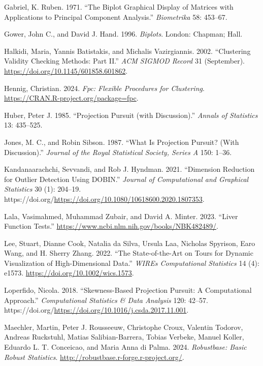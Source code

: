 \documentclass[
  12pt,
]{interact}
\newlength{\cslhangindent}
\newenvironment{CSLReferences}[2] %
 {\begin{list}{}{%
  \setlength{\itemindent}{0pt}
  \setlength{\leftmargin}{0pt}
  \setlength{\parsep}{0pt}
  \ifodd #1
   \setlength{\leftmargin}{\cslhangindent}
   \setlength{\itemindent}{-1\cslhangindent}
  \fi
  \setlength{\itemsep}{#2\baselineskip}}}
 {\end{list}}
\begin{document}
\begin{CSLReferences}{1}{0}
Gabriel, K. Ruben. 1971. {``The {B}iplot {G}raphical {D}isplay of
{M}atrices with {A}pplications to {P}rincipal {C}omponent {A}nalysis.''}
\emph{Biometrika} 58: 453--67.

Gower, John C., and David J. Hand. 1996. \emph{Biplots}. London:
Chapman; Hall.

Halkidi, Maria, Yannis Batistakis, and Michalis Vazirgiannis. 2002.
{``Clustering Validity Checking Methods: Part II.''} \emph{ACM SIGMOD
Record} 31 (September). \url{https://doi.org/10.1145/601858.601862}.

Hennig, Christian. 2024. \emph{Fpc: Flexible Procedures for Clustering}.
\url{https://CRAN.R-project.org/package=fpc}.

Huber, Peter J. 1985. {``{P}rojection {P}ursuit (with Discussion).''}
\emph{Annals of Statistics} 13: 435--525.

Jones, M. C., and Robin Sibson. 1987. {``{W}hat Is {P}rojection
{P}ursuit? (With Discussion).''} \emph{Journal of the Royal Statistical
Society, Series A} 150: 1--36.

Kandanaarachchi, Sevvandi, and Rob J. Hyndman. 2021. {``Dimension
Reduction for Outlier Detection Using DOBIN.''} \emph{Journal of
Computational and Graphical Statistics} 30 (1): 204--19.
https://doi.org/\url{https://doi.org/10.1080/10618600.2020.1807353}.

Lala, Vasimahmed, Muhammad Zubair, and David A. Minter. 2023. {``Liver
Function Tests.''} \url{https://www.ncbi.nlm.nih.gov/books/NBK482489/}.

Lee, Stuart, Dianne Cook, Natalia da Silva, Ursula Laa, Nicholas
Spyrison, Earo Wang, and H. Sherry Zhang. 2022. {``The State-of-the-Art
on Tours for Dynamic Visualization of High-Dimensional Data.''}
\emph{WIREs Computational Statistics} 14 (4): e1573.
\url{https://doi.org/10.1002/wics.1573}.

Loperfido, Nicola. 2018. {``Skewness-Based Projection Pursuit: A
Computational Approach.''} \emph{Computational Statistics \& Data
Analysis} 120: 42--57.
https://doi.org/\url{https://doi.org/10.1016/j.csda.2017.11.001}.

Maechler, Martin, Peter J. Rousseeuw, Christophe Croux, Valentin
Todorov, Andreas Ruckstuhl, Matias Salibian-Barrera, Tobias Verbeke,
Manuel Koller, Eduardo L. T. Conceicao, and Maria Anna di Palma. 2024.
\emph{Robustbase: Basic Robust Statistics}.
\url{http://robustbase.r-forge.r-project.org/}.


\end{CSLReferences}
\end{document}
